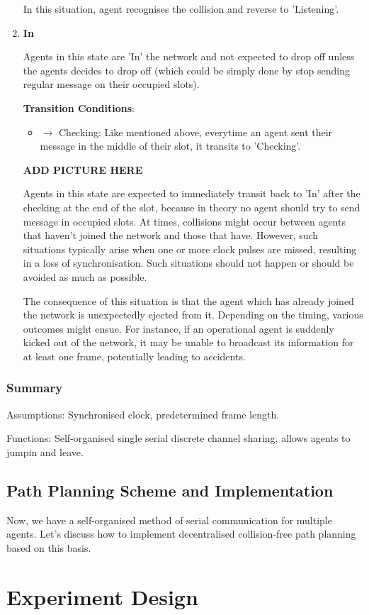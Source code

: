\begin{enumerate}
    In this situation, agent recognises the collision and reverse to 'Listening'.

    \item \textbf{In}
    
    Agents in this state are 'In' the network and not expected to drop off unless the agents decides to drop off (which could be simply done by stop sending regular message on their occupied slots). 

    \textbf{Transition Conditions}:

    \begin{itemize}
        \item $\rightarrow$ Checking: Like mentioned above, everytime an agent sent their message in the middle of their slot, it transits to 'Checking'.
    \end{itemize}

    \textbf{ADD PICTURE HERE} %

    Agents in this state are expected to immediately transit back to 'In' after the checking at the end of the slot, because in theory no agent should try to send message in occupied slots.
    At times, collisions might occur between agents that haven't joined the network and those that have. However, such situations typically arise when one or more clock pulses are missed, resulting in a loss of synchronisation. Such situations should not happen or should be avoided as much as possible.

    The consequence of this situation is that the agent which has already joined the network is unexpectedly ejected from it. 
    Depending on the timing, various outcomes might ensue. For instance, if an operational agent is suddenly kicked out of the network, it may be unable to broadcast its information for at least one frame, potentially leading to accidents.

\end{enumerate}

\subsubsection{Summary}

Assumptions: Synchronised clock, predetermined frame length.

Functions: Self-organised single serial discrete channel sharing, allows agents to jumpin and leave.


\subsection{Path Planning Scheme and Implementation}


Now, we have a self-organised method of serial communication for multiple agents. 
Let's discuss how to implement decentralised collision-free path planning based on this basis.




\section{Experiment Design}
